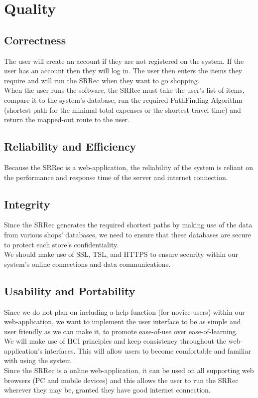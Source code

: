 \documentclass[12pt]{article}
\begin{document}
\section{Quality}
\subsection{Correctness}
The user will create an account if they are not registered on the system. If the user has an account then they will log in. The user then enters the items they require and will run the SRRec when they want to go shopping.\\
When the user runs the software, the SRRec must take the user's list of items, compare it to the system's database, run the required PathFinding Algorithm (shortest path for the minimal total expenses or the shortest travel time) and return the mapped-out route to the user.
\subsection{Reliability and Efficiency}
Because the SRRec is a web-application, the reliability of the system is reliant on the performance and response time of the server and internet connection. 
\subsection{Integrity}
Since the SRRec generates the required shortest paths by making use of the data from various shops' databases, we need to ensure that these databases are secure to protect each store's confidentiality. \\
We should make use of SSL, TSL, and HTTPS to ensure security within our system's online connections and data communications.
\subsection{Usability and Portability}
Since we do not plan on including a help function (for novice users) within our web-application, we want to implement the user interface to be as simple and user friendly as we can make it, to promote ease-of-use over ease-of-learning.\\
We will make use of HCI principles and keep consistency throughout the web-application's interfaces. This will allow users to become comfortable and familiar with using the system.\\
Since the SRRec is a online web-application, it can be used on all supporting web browsers (PC and mobile devices) and this allows the user to run the SRRec wherever they may be, granted they have good internet connection.\\
\end{document}

